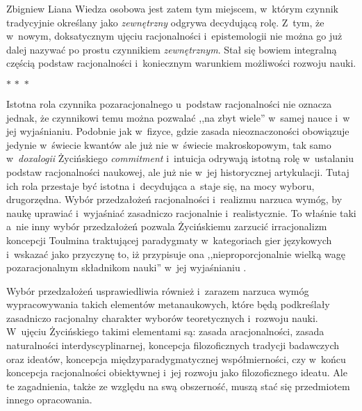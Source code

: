 \begin{artplenv}{Zbigniew Liana}
Wiedza osobowa jest zatem tym miejscem, w~którym czynnik tradycyjnie określany jako \textit{zewnętrzny} odgrywa decydującą rolę. Z~tym, że w~nowym, doksatycznym ujęciu racjonalności i~epistemologii nie można go już dalej nazywać po prostu czynnikiem \textit{zewnętrznym}. Stał się bowiem integralną częścią podstaw racjonalności i~koniecznym warunkiem możliwości rozwoju nauki.

\begin{center}
$ {\ast}\,{\ast}\,{\ast} $
\end{center}

Istotna rola czynnika pozaracjonalnego u~podstaw racjonalności nie oznacza jednak, że czynnikowi temu można pozwalać ,,na zbyt wiele'' w~samej nauce i~w jej wyjaśnianiu. Podobnie jak w~fizyce, gdzie zasada nieoznaczoności obowiązuje jedynie w~świecie kwantów ale już nie w~świecie makroskopowym, tak samo w~\textit{doxalogii} Życińskiego \textit{commitment} i~intuicja odrywają istotną rolę w~ustalaniu podstaw racjonalności naukowej, ale już nie w~jej historycznej artykulacji. Tutaj ich rola przestaje być istotna i~decydująca a~staje się, na mocy wyboru, drugorzędna. Wybór przedzałożeń racjonalności i~realizmu narzuca wymóg, by naukę uprawiać i~wyjaśniać zasadniczo racjonalnie i~realistycznie. To właśnie taki a~nie inny wybór przedzałożeń pozwala Życińskiemu zarzucić irracjonalizm koncepcji Toulmina traktującej paradygmaty w~kategoriach gier językowych i~wskazać jako przyczynę to, iż przypisuje ona ,,nieproporcjonalnie wielką wagę pozaracjonalnym składnikom nauki'' w~jej wyjaśnianiu
\parencites[][s.~202]{zycinski_elementy_1996}[][s.~275]{zycinski_elementy_2015}.%


Wybór przedzałożeń usprawiedliwia również i~zarazem narzuca wymóg wypracowywania takich elementów metanaukowych, które będą podkreślały zasadniczo racjonalny charakter wyborów teoretycznych i~rozwoju nauki. W~ujęciu Życińskiego takimi elementami są: zasada aracjonalności, zasada naturalności interdyscyplinarnej, koncepcja filozoficznych tradycji badawczych oraz ideatów, koncepcja międzyparadygmatycznej współmierności, czy w~końcu koncepcja racjonalności obiektywnej i~jej rozwoju jako filozoficznego ideatu. Ale te zagadnienia, także ze względu na swą obszerność, muszą stać się przedmiotem innego opracowania.


\end{artplenv}
